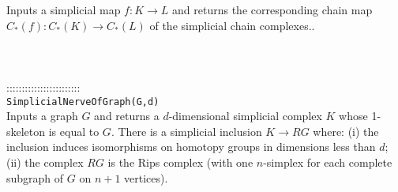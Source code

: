\documentclass[a4paper,11pt]{report}
\begin{document}
{ Inputs a simplicial map $f\colon K \rightarrow L$ and returns the corresponding chain map $C_\ast(f) \colon C_\ast(K) \rightarrow C_\ast(L)$ of the simplicial chain complexes.. \\
 \\
 \\
 \\
 ::::::::::::::::::::::::\\
 \texttt{SimplicialNerveOfGraph(G,d)}\\
 

 Inputs a graph $G$ and returns a $d$-dimensional simplicial complex $K$ whose 1-skeleton is equal to $G$. There is a simplicial inclusion $K \rightarrow RG$ where: (i) the inclusion induces isomorphisms on homotopy groups in dimensions
less than $d$; (ii) the complex $RG$ is the Rips complex (with one $n$-simplex for each complete subgraph of $G$ on $n+1$ vertices). \\
 \\
 \\
 }

 
\end{document}
